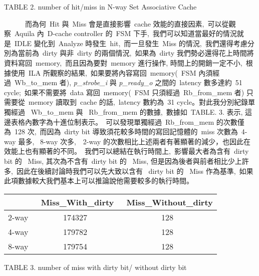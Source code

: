 \documentclass{article}
\begin{document}
\begin{CJK*}{UTF8}{bsmi}
\begin{multicols}{2}
\begin{center}
    \small{TABLE 2. number of hit/miss in N-way Set Associative Cache}\\
\end{center}

\columnbreak

\begin{flushleft}
    \ \ \ \ \ \ 而為何\ Hit 與\ Miss 會是直接影響\ cache 效能的直接因素,\
    可以從觀察\ Aquila 內\ D-cache controller 的\ FSM 下手,\
    我們可以知道當最好的情況就是\ IDLE 變化到\ Analyze 時發生\ hit,\
    而一旦發生\ Miss 的情況,\
    我們還得考慮分別為當前為\ dirty 與非\ dirty 的兩個情況,\
    如果為\ dirty 我們勢必還得花上時間將資料寫回\ memory,\
    而且因為要對\ memory 進行操作, 時間上的開銷一定不小,\
    根據使用\ ILA 所觀察的結果,\
    如果要將內容寫回\ memory(\ FSM 內須經過\ Wb\_to\_mem 者), \emph{p\_strobe\_i} 與 \emph{p\_ready\_o} 之間的\ latency 數多達約\ 51 cycle;\
    如果不需要將\ data 寫回\ memory(\ FSM 只須經過\ Rb\_from\_mem 者) 只需要從\ memory 讀取到\ cache 的話,\
    latency 數約為\ 31 cycle。對此我分別紀錄單獨經過 \ Wb\_to\_mem 與 \ Rb\_from\_mem 的數據,\
    數據如\ TABLE. 3. 表示, 這邊表格內數字為十進位制表示。\
    可以發現單獨經過\ Rb\_from\_mem 的次數僅為\ 128 次,\
    而因為\ dirty bit 導致須花較多時間的寫回記憶體的\ miss 次數為\ 4-way 最多, \ 8-way 次多,\
    \ 2-way 的次數相比上述兩者有著顯著的減少，也因此在效能上也有顯著的不同。\
    我們可以總結在執行時間上,\ 影響最大者為含有\ dirty bit 的 \ Miss, 其次為不含有\ dirty bit 的 \ Miss,
    但是因為後者與前者相比少上許多,\
    因此在後續討論時我們可以先大致以含有 \ dirty bit 的 \ Miss 作為基準,\
    如果此項數據較大我們基本上可以推論說他需要較多的執行時間。
\end{flushleft}

\begin{center}
    \begin{tabular}{||c c c ||} 
     \hline
      & \ Miss\_With\_dirty & \ Miss\_Without\_dirty \\ [2ex] 
     \hline\hline
     2-way & 174327 & 128 \\ 
     \hline
     4-way & 179782 & 128 \\ 
     \hline
     8-way & 179754 & 128 \\ 
     \hline
    \end{tabular}
\end{center}

\begin{center}
    \small{TABLE 3. number of miss with dirty bit/ without dirty bit}\\
\end{center}


\end{multicols}
\end{CJK*}
\end{document}
